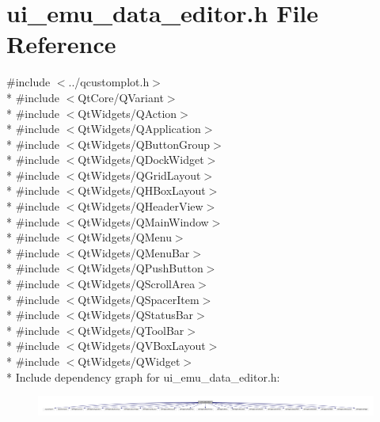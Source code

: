 \hypertarget{a00051}{\section{ui\+\_\+emu\+\_\+data\+\_\+editor.\+h File Reference}
\label{a00051}
}
{\ttfamily \#include $<$../qcustomplot.\+h$>$}\\*
{\ttfamily \#include $<$Qt\+Core/\+Q\+Variant$>$}\\*
{\ttfamily \#include $<$Qt\+Widgets/\+Q\+Action$>$}\\*
{\ttfamily \#include $<$Qt\+Widgets/\+Q\+Application$>$}\\*
{\ttfamily \#include $<$Qt\+Widgets/\+Q\+Button\+Group$>$}\\*
{\ttfamily \#include $<$Qt\+Widgets/\+Q\+Dock\+Widget$>$}\\*
{\ttfamily \#include $<$Qt\+Widgets/\+Q\+Grid\+Layout$>$}\\*
{\ttfamily \#include $<$Qt\+Widgets/\+Q\+H\+Box\+Layout$>$}\\*
{\ttfamily \#include $<$Qt\+Widgets/\+Q\+Header\+View$>$}\\*
{\ttfamily \#include $<$Qt\+Widgets/\+Q\+Main\+Window$>$}\\*
{\ttfamily \#include $<$Qt\+Widgets/\+Q\+Menu$>$}\\*
{\ttfamily \#include $<$Qt\+Widgets/\+Q\+Menu\+Bar$>$}\\*
{\ttfamily \#include $<$Qt\+Widgets/\+Q\+Push\+Button$>$}\\*
{\ttfamily \#include $<$Qt\+Widgets/\+Q\+Scroll\+Area$>$}\\*
{\ttfamily \#include $<$Qt\+Widgets/\+Q\+Spacer\+Item$>$}\\*
{\ttfamily \#include $<$Qt\+Widgets/\+Q\+Status\+Bar$>$}\\*
{\ttfamily \#include $<$Qt\+Widgets/\+Q\+Tool\+Bar$>$}\\*
{\ttfamily \#include $<$Qt\+Widgets/\+Q\+V\+Box\+Layout$>$}\\*
{\ttfamily \#include $<$Qt\+Widgets/\+Q\+Widget$>$}\\*
Include dependency graph for ui\+\_\+emu\+\_\+data\+\_\+editor.\+h\+:
\nopagebreak
\begin{figure}[H]
\begin{center}
\leavevmode
\includegraphics[width=350pt]{d0/d19/a00273}
\end{center}
\end{figure}
